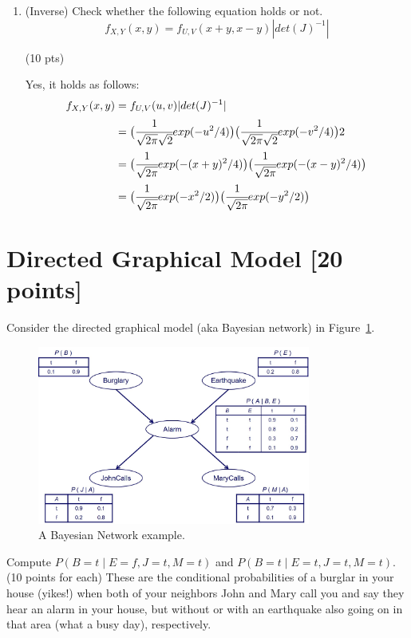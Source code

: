 \documentclass[a4paper]{article}
\theoremstyle{definition}
\newenvironment{soln}{
	\leavevmode\color{blue}\ignorespaces
}{}
\begin{document}
\begin{enumerate}[label=(\alph*)]
		\item (Inverse) Check whether the following equation holds or not.
		$$f_{X, Y}(x, y)=f_{U, V}(x+y, x-y)|det(J)^{-1}|$$
		
		\hfill (10 pts) 
		
		\begin{soln} 
		Yes, it holds as follows:
		\begin{align*}
			f_{X, Y}(x, y)&=f_{U, V}(u, v)|det(J)^{-1}|\\
			&=\big (\cfrac{1}{\sqrt{2\pi}\sqrt{2}}exp(-u^{2}/4)\big ) \big (\cfrac{1}{\sqrt{2\pi}\sqrt{2}}exp(-v^{2}/4)\big )2\\
			&=\big (\cfrac{1}{\sqrt{2\pi}}exp(-(x+y)^{2}/4)\big ) \big (\cfrac{1}{\sqrt{2\pi}}exp(-(x-y)^{2}/4)\big )\\
			&=\big (\cfrac{1}{\sqrt{2\pi}}exp(-x^{2}/2)\big ) \big (\cfrac{1}{\sqrt{2\pi}}exp(-y^{2}/2)\big )
		\end{align*}
		\end{soln}
	\end{enumerate}

\section{Directed Graphical Model [20 points]}
Consider the directed graphical model (aka Bayesian network) in Figure~\ref{fig:bn}.
\begin{figure}[H]
    \centering
    \includegraphics[width=0.8\textwidth]{BN.jpg}
    \caption{A Bayesian Network example.}
    \label{fig:bn}
\end{figure}
Compute $P(B=t \mid E=f,J=t,M=t)$ and $P(B=t \mid E=t,J=t,M=t)$. (10 points for each) These are the conditional probabilities of a burglar in your house (yikes!) when both of your neighbors John and Mary call you and say they hear an alarm in your house, but without or with an earthquake also going on in that area (what a busy day), respectively.
\end{document}

